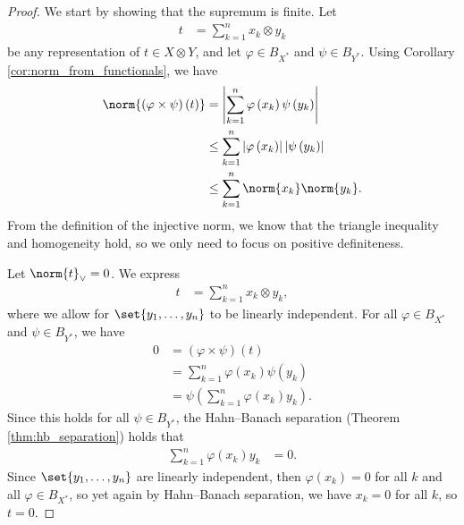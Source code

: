 \begin{proof}
  We start by showing that the supremum is finite. Let
  \begin{align*}
    t &= \sum_{k=1}^{n} x_k\otimes y_k
  \end{align*}
  be any representation of $t\in X\otimes Y$, and let $\varphi\in B_{X^{\ast}}$ and $\psi\in B_{Y^{\ast}}$. Using Corollary \ref{cor:norm_from_functionals}, we have
  \begin{align*}
    \norm{\left( \varphi\times \psi \right)\left( t \right)} &= \left\vert \sum_{k=1}^{n}\varphi\left( x_k \right)\psi\left( y_k \right) \right\vert\\
                                                             &\leq \sum_{k=1}^{n} \left\vert \varphi\left( x_k \right) \right\vert\left\vert \psi\left( y_k \right) \right\vert\\
                                                             &\leq \sum_{k=1}^{n}\norm{x_k}\norm{y_k}.
  \end{align*}
  From the definition of the injective norm, we know that the triangle inequality and homogeneity hold, so we only need to focus on positive definiteness.\newline

  Let $\norm{t}_{\vee} = 0$. We express
  \begin{align*}
    t &= \sum_{k=1}^{n}x_k\otimes y_k,
  \end{align*}
  where we allow for $\set{y_1,\dots,y_n}$ to be linearly independent. For all $\varphi\in B_{X^{\ast}}$ and $\psi\in B_{Y^{\ast}}$, we have
  \begin{align*}
    0 &= \left( \varphi\times \psi \right)\left( t \right)\\
      &= \sum_{k=1}^{n}\varphi\left( x_k \right)\psi\left( y_k \right)\\
      &= \psi\left( \sum_{k=1}^{n}\varphi\left( x_k \right)y_k \right).
  \end{align*}
  Since this holds for all $\psi\in B_{Y^{\ast}}$, the Hahn--Banach separation (Theorem \ref{thm:hb_separation}) holds that
  \begin{align*}
    \sum_{k=1}^{n}\varphi\left( x_k \right)y_k &= 0.
  \end{align*}
  Since $\set{y_1,\dots,y_n}$ are linearly independent, then $\varphi\left( x_k \right) = 0$ for all $k$ and all $\varphi\in B_{X^{\ast}}$, so yet again by Hahn--Banach separation, we have $x_k = 0$ for all $k$, so $t = 0$.\newline


\end{proof}
